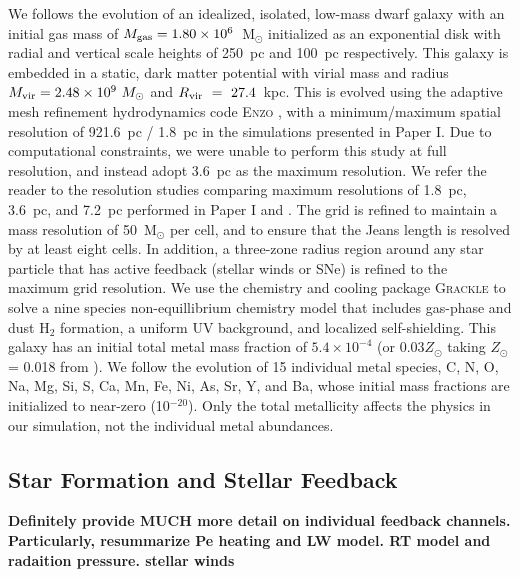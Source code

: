 \documentclass[twocolumn]{aastex62}
\begin{document}
We follows the evolution of an idealized, isolated, low-mass dwarf galaxy with an initial gas mass of $M_{\rm gas} = 1.80 \times 10^6$~M$_{\odot}$ initialized as an exponential disk with radial and vertical scale heights of 250~pc and 100~pc respectively. This galaxy is embedded in a static, \cite{Burkert1995} dark matter potential with virial mass and radius $M_{\rm vir} = 2.48\times 10^{9}~M_{\odot}$ and $R_{\rm vir}~=~27.4$~kpc. This is evolved using the adaptive mesh refinement hydrodynamics code \textsc{Enzo} \citep{Enzo2014}, with a minimum/maximum spatial resolution of 921.6~pc / 1.8~pc in the simulations presented in Paper I. Due to computational constraints, we were unable to perform this study at full resolution, and instead adopt 3.6~pc as the maximum resolution. We refer the reader to the resolution studies comparing maximum resolutions of 1.8~pc, 3.6~pc, and 7.2~pc performed in Paper I and \cite{Emerick2018b}. %
The grid is refined to maintain a mass resolution of 50~M$_{\odot}$ per cell, and to ensure that the Jeans length is resolved by at least eight cells. In addition, a three-zone radius region around any star particle that has active feedback (stellar winds or SNe) is refined to the maximum grid resolution. We use the chemistry and cooling package \textsc{Grackle} \citep{GrackleMethod} to solve a nine species non-equillibrium chemistry model that includes gas-phase and dust H$_2$ formation, a uniform UV background, and localized self-shielding. This galaxy has an initial total metal mass fraction of $5.4 \times 10^{-4}$ (or $0.03 Z_{\odot}$ taking $Z_{\odot}$ = 0.018 from \cite{Asplund2009}). We follow the evolution of 15 individual metal species, C, N, O, Na, Mg, Si, S, Ca, Mn, Fe, Ni, As, Sr, Y, and Ba, whose initial mass fractions are initialized to near-zero (10$^{-20}$). Only the total metallicity affects the physics in our simulation, not the individual metal abundances. 

\subsection{Star Formation and Stellar Feedback}
\textbf{Definitely provide MUCH more detail on individual feedback channels. Particularly, resummarize Pe heating and LW model. RT model and radaition pressure. stellar winds}
\end{document}
